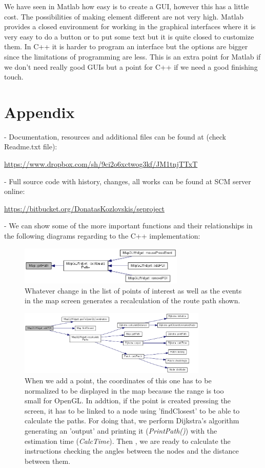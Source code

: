 \documentclass{article}
\begin{document}
We have seen in Matlab how easy is to create a GUI, however this has a little cost. The possibilities of making element different are not very high. Matlab provides a closed environment for working in the graphical interfaces where it is very easy to do a button or to put some text but it is quite closed to customize them. In C++ it is harder to program an interface but the options are bigger since the limitations of programming are less. This is an extra point for Matlab if we don't need really good GUIs but a point for C++ if we need a good finishing touch.


\clearpage
\section{Appendix}

- Documentation, resources and additional files can be found at (check Readme.txt file): 

\url{https://www.dropbox.com/sh/9ci2o6xctwog3kf/JM1tnjTTxT}

- Full source code with history, changes, all works can be found at SCM server online:

\url{https://bitbucket.org/DonatasKozlovskis/seproject} 

- We can show some of the more important functions and their relationships in the following diagrams regarding to the C++ implementation:

\begin{figure}[h]
\centering
\includegraphics[width=0.7\textwidth]{2.png}
\caption{Whatever change in the list of points of interest as well as the events in the map screen generates a recalculation of the route path shown.}
\end{figure}

\begin{figure}[h]
\centering
\includegraphics[width=0.8\textwidth]{4.png}
\caption{When we add a point, the coordinates of this one has to be normalized to be displayed in the map because the range is too small for OpenGL. In addtion, if the point is created pressing the screen, it has to be linked to a node using 'findClosest' to be able to calculate the paths. For doing that, we perform Dijkstra's algorithm generating an 'output' and printing it (\textit{PrintPath()}) with the estimation time (\textit{CalcTime}). Then , we are ready to calculate the instructions checking the angles between the nodes and the distance between them.}
\end{figure}
\end{document}

